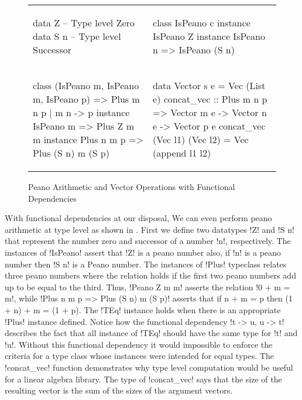 \documentclass[format=acmsmall,manuscript,review,screen,nonacm,margin=1in,11pt]{acmart}
\begin{document}
\begin{figure}[ht]
  \footnotesize
  \begin{tabular}{l l}
\begin{code}
data Z   -- Type level Zero
data S n -- Type level Successor
\end{code}&%
\begin{code}
class IsPeano c
instance IsPeano Z
instance IsPeano n => IsPeano (S n)
\end{code}\\
\begin{code}
class (IsPeano m, IsPeano m, IsPeano p)
  => Plus m n p | m n -> p
instance IsPeano m => Plus Z m m
instance Plus n m p => Plus (S n) m (S p)
\end{code}&%
\begin{code}
data Vector s e = Vec (List e)
concat_vec :: Plus m n p
     => Vector m e -> Vector n e -> Vector p e
concat_vec (Vec l1) (Vec l2) = Vec (append l1 l2)
\end{code}
  \end{tabular}
  \caption{Peano Arithmetic and Vector Operations with Functional Dependencies}
  \label{fig:peano-arith}
\end{figure}
With functional dependencies at our disposal, We can even perform peano arithmetic at type level
as shown in . First we define two datatypes !Z! and !S n!
that represent the number zero and successor of a number !n!, respectively.
The instances of !IsPeano! assert that !Z! is a peano number also, if !n! is a peano number
then !S n! is a Peano number. The instances of !Plus! typeclass relates three peano numbers where the relation
holds if the first two peano numbers add up to be equal to the third. Thus, !Peano Z m m! asserts the relation
!0 + m = m!, while !Plus n m p => Plus (S n) m (S p)! asserts that if n + m = p then (1 + n) + m = (1 + p).
The !TEq! instance holds when there is an appropriate !Plus! instance defined. Notice how the functional dependency
!t -> u, u -> t! describes the fact that all instance of !TEq! should have the same type for !t! and !u!. Without this
functional dependency it would impossible to enforce the criteria for a type class whose instances were intended for
equal types. The !concat_vec! function demonstrates why type level computation would be useful
for a linear algebra library. The type of !concat_vec! says that the size of the resulting
vector is the sum of the sizes of the argument vectors.
\end{document}
